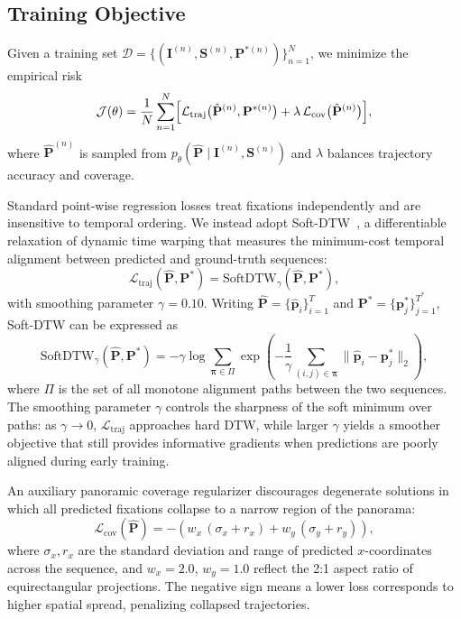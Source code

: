 \documentclass[sigconf]{acmart}
\begin{document}
\subsection{Training Objective}
Given a training set $\mathcal{D} = \{(\mathbf{I}^{(n)}, \mathbf{S}^{(n)}, \mathbf{P}^{*(n)})\}_{n=1}^{N}$, we minimize the empirical risk
\begin{equation}
  \mathcal{J}(\theta)
  = \frac{1}{N} \sum_{n=1}^{N}
    \Bigl[
      \mathcal{L}_{\mathrm{traj}}\bigl(\hat{\mathbf{P}}^{(n)}, \mathbf{P}^{*(n)}\bigr)
      + \lambda\,\mathcal{L}_{\mathrm{cov}}\bigl(\hat{\mathbf{P}}^{(n)}\bigr)
    \Bigr],
  \label{eq:empirical_risk}
\end{equation}
where $\hat{\mathbf{P}}^{(n)}$ is sampled from $p_\theta(\hat{\mathbf{P}} \mid \mathbf{I}^{(n)}, \mathbf{S}^{(n)})$ and $\lambda$ balances trajectory accuracy and coverage.

Standard point-wise regression losses treat fixations independently and are insensitive to temporal ordering. We instead adopt Soft-DTW~\cite{cuturi2017soft}, a differentiable relaxation of dynamic time warping that measures the minimum-cost temporal alignment between predicted and ground-truth sequences:
\begin{equation}
  \mathcal{L}_{\mathrm{traj}}(\hat{\mathbf{P}}, \mathbf{P}^*) = \mathrm{SoftDTW}_\gamma(\hat{\mathbf{P}}, \mathbf{P}^*),
\end{equation}
with smoothing parameter $\gamma = 0.10$. Writing $\hat{\mathbf{P}} = \{\hat{\mathbf{p}}_i\}_{i=1}^{T}$ and $\mathbf{P}^* = \{\mathbf{p}^*_j\}_{j=1}^{T^*}$, Soft-DTW can be expressed as
\begin{equation}
  \mathrm{SoftDTW}_\gamma(\hat{\mathbf{P}}, \mathbf{P}^*)
  = -\gamma \log \sum_{\boldsymbol{\pi} \in \Pi}
      \exp\!\left(
        - \frac{1}{\gamma}
          \sum_{(i,j) \in \boldsymbol{\pi}}
            \bigl\|\hat{\mathbf{p}}_i - \mathbf{p}^*_j\bigr\|_2
      \right),
\end{equation}
where $\Pi$ is the set of all monotone alignment paths between the two sequences. The smoothing parameter $\gamma$ controls the sharpness of the soft minimum over paths: as $\gamma \to 0$, $\mathcal{L}_{\mathrm{traj}}$ approaches hard DTW, while larger $\gamma$ yields a smoother objective that still provides informative gradients when predictions are poorly aligned during early training.

An auxiliary panoramic coverage regularizer discourages degenerate solutions in which all predicted fixations collapse to a narrow region of the panorama:
\begin{equation}
  \mathcal{L}_{\mathrm{cov}}(\hat{\mathbf{P}}) = -\!\left(w_x\,(\sigma_x + r_x) + w_y\,(\sigma_y + r_y)\right),
\end{equation}
where $\sigma_x, r_x$ are the standard deviation and range of predicted $x$-coordinates across the sequence, and $w_x=2.0$, $w_y=1.0$ reflect the 2:1 aspect ratio of equirectangular projections. The negative sign means a lower loss corresponds to higher spatial spread, penalizing collapsed trajectories.
\end{document}
